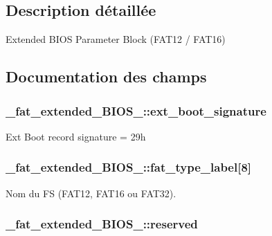 \subsection{Description détaillée}
Extended B\-I\-O\-S Parameter Block (F\-A\-T12 / F\-A\-T16) 

\subsection{Documentation des champs}
\hypertarget{struct__fat__extended__BIOS__16_a96dde388d85873830b8b421d13336737}{
\subsubsection[{ext\-\_\-boot\-\_\-signature}]{ \-\_\-fat\-\_\-extended\-\_\-\-B\-I\-O\-S\-\_\-::ext\-\_\-boot\-\_\-signature}}\label{struct__fat__extended__BIOS__16_a96dde388d85873830b8b421d13336737}
Ext Boot record signature = 29h \hypertarget{struct__fat__extended__BIOS__16_a0cdaccd704186c37f3df6b7a44fdbad8}{
\subsubsection[{fat\-\_\-type\-\_\-label}]{ \-\_\-fat\-\_\-extended\-\_\-\-B\-I\-O\-S\-\_\-::fat\-\_\-type\-\_\-label\mbox{[}8\mbox{]}}}\label{struct__fat__extended__BIOS__16_a0cdaccd704186c37f3df6b7a44fdbad8}
Nom du F\-S (F\-A\-T12, F\-A\-T16 ou F\-A\-T32). \hypertarget{struct__fat__extended__BIOS__16_a893876cfc91a64059613c6fe02a1e178}{
\subsubsection[{reserved}]{ \-\_\-fat\-\_\-extended\-\_\-\-B\-I\-O\-S\-\_\-::reserved}}\label{struct__fat__extended__BIOS__16_a893876cfc91a64059613c6fe02a1e178}
